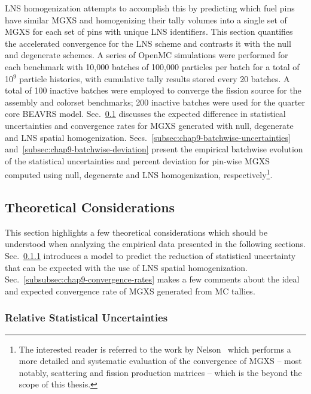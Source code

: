 \ac{LNS} homogenization attempts to accomplish this by predicting which fuel pins have similar \ac{MGXS} and homogenizing their tally volumes into a single set of \ac{MGXS} for each set of pins with unique \ac{LNS} identifiers. This section quantifies the accelerated convergence for the \ac{LNS} scheme and contrasts it with the null and degenerate schemes. A series of OpenMC simulations were performed for each benchmark with 10,000 batches of 100,000 particles per batch for a total of 10$^{9}$ particle histories, with cumulative tally results stored every 20 batches. A total of 100 inactive batches were employed to converge the fission source for the assembly and colorset benchmarks; 200 inactive batches were used for the quarter core \ac{BEAVRS} model. Sec.~\ref{subsec:chap9-theory} discusses the expected difference in statistical uncertainties and convergence rates for \ac{MGXS} generated with null, degenerate and \ac{LNS} spatial homogenization. Secs.~\ref{subsec:chap9-batchwise-uncertainties} and~\ref{subsec:chap9-batchwise-deviation} present the empirical batchwise evolution of the statistical uncertainties and percent deviation for pin-wise \ac{MGXS} computed using null, degenerate and \ac{LNS} homogenization, respectively\footnote{The interested reader is referred to the work by Nelson~\cite{nelson2014improved} which performs a more detailed and systematic evaluation of the convergence of \ac{MGXS} -- most notably, scattering and fission production matrices -- which is the beyond the scope of this thesis.}.

\subsection{Theoretical Considerations}
\label{subsec:chap9-theory}

This section highlights a few theoretical considerations which should be understood when analyzing the empirical data presented in the following sections. Sec.~\ref{subsubsec:chap9-relative-uncertainties} introduces a model to predict the reduction of statistical uncertainty that can be expected with the use of \ac{LNS} spatial homogenization. Sec.~\ref{subsubsec:chap9-convergence-rates} makes a few comments about the ideal and expected convergence rate of \ac{MGXS} generated from \ac{MC} tallies.

\subsubsection{Relative Statistical Uncertainties}
\label{subsubsec:chap9-relative-uncertainties}

